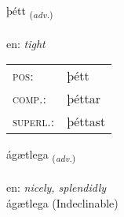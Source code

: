 \documentclass[frontgrid, backgrid]{flacards}\usepackage[]{graphicx}\usepackage[]{color}
\begin{document}
\renewcommand{\flhead}{\vskip5pt \fboxsep=0pt {\small\bfseries\footnotesize Atviksorð | Adverb}}
\renewcommand{\fcfoot}{\vskip5pt \fboxsep=0pt \hspace{2pt}{\small\bfseries\footnotesize 2K}}

\renewcommand{\blhead}{\vskip5pt {\small\bfseries\footnotesize Atviksorð | Adverb }}
\renewcommand{\bcfoot}{\vskip5pt \hspace{2pt}{\small\bfseries\footnotesize 2K}}


{þétt \small{\textsubscript{(\textit{adv.})}} \\[1ex] %
\textphonetic{[θjɛht]} \\
en: \emph{tight} \\  [2ex]
\renewcommand*{\arraystretch}{0.8}
\begin{tabular}{ll}
\textsc{pos}: & þétt \\ 
\textsc{comp.}: & þéttar \\ 
\textsc{superl.}: & þéttast \\
\end{tabular}
}


\renewcommand{\flhead}{\vskip5pt \fboxsep=0pt {\small\bfseries\footnotesize Atviksorð | Adverb}}
\renewcommand{\fcfoot}{\vskip5pt \fboxsep=0pt \hspace{2pt}{\small\bfseries\footnotesize 2K}}

\renewcommand{\blhead}{\vskip5pt {\small\bfseries\footnotesize Atviksorð | Adverb }}
\renewcommand{\bcfoot}{\vskip5pt \hspace{2pt}{\small\bfseries\footnotesize 2K}}


{ágætlega \small{\textsubscript{(\textit{adv.})}} \\[1ex]
\textphonetic{[auːcaitlɛɣa]} \\
en: \emph{nicely, splendidly} \\  [2ex]
ágætlega (Indeclinable)}

\renewcommand{\flhead}{\vskip5pt \fboxsep=0pt {\small\bfseries\footnotesize Sagnorð | Verb}}
\renewcommand{\fcfoot}{\vskip5pt \fboxsep=0pt \hspace{2pt}{\small\bfseries\footnotesize 2K}}
\end{document}
